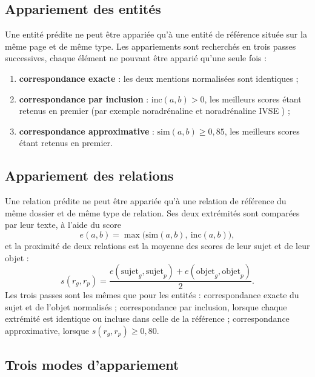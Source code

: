 \subsection{Appariement des entités}

Une entité prédite ne peut être appariée qu'à une entité de référence située sur la même page et de même type. Les appariements sont recherchés en trois passes successives, chaque élément ne pouvant être apparié qu'une seule fois :
\begin{enumerate}
  \item \textbf{correspondance exacte} : les deux mentions normalisées sont identiques ;
  \item \textbf{correspondance par inclusion} : $\mathrm{inc}(a,b) > 0$, les meilleurs scores étant retenus en premier (par exemple \og noradrénaline \fg{} et \og noradrénaline IVSE \fg{}) ;
  \item \textbf{correspondance approximative} : $\mathrm{sim}(a,b) \geq 0{,}85$, les meilleurs scores étant retenus en premier.
\end{enumerate}

\subsection{Appariement des relations}

Une relation prédite ne peut être appariée qu'à une relation de référence du même dossier et de même type de relation. Ses deux extrémités sont comparées par leur texte, à l'aide du score
\begin{equation}
e(a, b) = \max\big(\mathrm{sim}(a,b),\ \mathrm{inc}(a,b)\big),
\end{equation}
et la proximité de deux relations est la moyenne des scores de leur sujet et de leur objet :
\begin{equation}
s(r_g, r_p) = \frac{e(\mathrm{sujet}_g, \mathrm{sujet}_p) + e(\mathrm{objet}_g, \mathrm{objet}_p)}{2}.
\end{equation}
Les trois passes sont les mêmes que pour les entités : correspondance exacte du sujet et de l'objet normalisés ; correspondance par inclusion, lorsque chaque extrémité est identique ou incluse dans celle de la référence ; correspondance approximative, lorsque $s(r_g, r_p) \geq 0{,}80$.

\subsection{Trois modes d'appariement}

